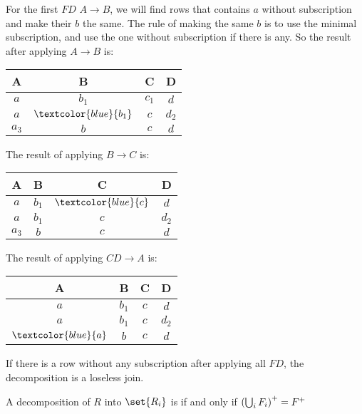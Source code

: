 For the first $FD$ $A \rightarrow B$, we will find rows that contains $a$ without subscription and make their $b$ the same. The rule of making the same $b$ is to use the minimal subscription, and use the one without subscription if there is any. So the result after applying $A \rightarrow B$ is:

\begin{center} 
   \begin{tabular}{|c|c|c|c|}
  \hline
  A & B & C & D \\
  \hline
  $a$ & $b_1$ & $c_1$ & $d$ \\
  \hline
  $a$ & $\textcolor{blue}{b_1}$ & $c$ & $d_2$ \\
  \hline
  $a_3$ & $b$ & $c$ & $d$ \\
  \hline
\end{tabular} 
\end{center}

The result of applying $B \rightarrow C$ is:

\begin{center} 
   \begin{tabular}{|c|c|c|c|}
  \hline
  A & B & C & D \\
  \hline
  $a$ & $b_1$ & $\textcolor{blue}{c}$ & $d$ \\
  \hline
  $a$ & $b_1$ & $c$ & $d_2$ \\
  \hline
  $a_3$ & $b$ & $c$ & $d$ \\
  \hline
\end{tabular} 
\end{center}

The result of applying $CD \rightarrow A$ is:
\begin{center} 
   \begin{tabular}{|c|c|c|c|}
  \hline
  A & B & C & D \\
  \hline
  $a$ & $b_1$ & $c$ & $d$ \\
  \hline
  $a$ & $b_1$ & $c$ & $d_2$ \\
  \hline
  $\textcolor{blue}{a}$ & $b$ & $c$ & $d$ \\
  \hline
\end{tabular} 
\end{center}

If there is a row without any subscription after applying all $FD$, the decomposition is a loseless join.


\begin{theorem}
    A decomposition of $R$ into $\set{R_i}$ is  if and only if $\mleft (\bigcup_i F_i \mright)^{+} = F^{+}$
\end{theorem}


